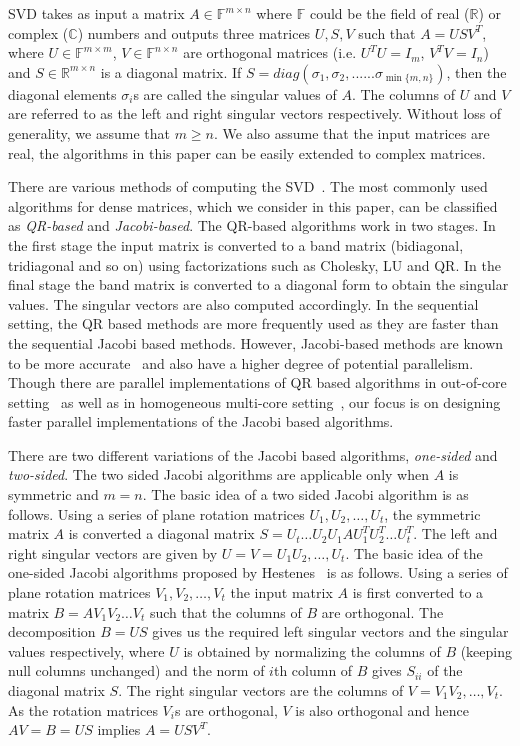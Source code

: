 \documentclass[10pt, conference, compsocconf]{IEEEtran}
\begin{document}
SVD takes as input a matrix $A \in \mathbb{F}^{m \times n}$ where $\mathbb{F}$ could be the field of real ($\mathbb{R}$) or complex ($\mathbb{C}$) numbers and outputs three matrices $U, S, V$ such that $A = USV^T$, where $U \in \mathbb{F}^{m \times m}$, $V \in \mathbb{F}^{n \times n}$ are orthogonal matrices (i.e. $U^TU = I_m$, $V^TV = I_n$) and $S \in \mathbb{R}^{m \times n}$ is a diagonal matrix. If $S = diag(\sigma_1, \sigma_2,......\sigma_{\min\{m,n\}})$, then the diagonal elements $\sigma_i$s are called the singular values of $A$. The columns of $U$ and $V$ are referred to as the left and right singular vectors respectively. Without loss of generality, we assume that $m \ge n$. We also assume that the input matrices are real, the algorithms in this paper can be easily extended to complex matrices. 

There are various methods of computing the SVD~\cite{golub2012matrix}. The most commonly used algorithms for dense matrices, which we consider in this paper, can be classified as \emph{QR-based} and \emph{Jacobi-based}. The QR-based algorithms work in two stages. In the first stage the input matrix is converted to a band matrix (bidiagonal, tridiagonal and so on) using factorizations such as Cholesky, LU and QR. In the final stage the band matrix is converted to a diagonal form to obtain the singular values. The singular vectors are also computed accordingly. In the sequential setting, the QR based methods are more frequently used as they are faster than the sequential Jacobi based methods. However, Jacobi-based methods are known to be more accurate~\cite{demmel1992jacobi} and also have a higher degree of potential parallelism. Though there are parallel implementations of QR based algorithms in out-of-core setting~\cite{grimes1987solution, grimes1988solution} as well as in homogeneous multi-core setting~\cite{haidar2013improved}, our focus is on designing faster parallel implementations of the Jacobi based algorithms.

There are two different variations of the Jacobi based algorithms, \emph{one-sided} and \emph{two-sided}. The two sided Jacobi algorithms are applicable only when $A$ is symmetric and $m=n$. The basic idea of a two sided Jacobi algorithm is as follows. Using a series of plane rotation matrices $U_1, U_2, \ldots, U_t$, the symmetric matrix $A$ is converted a diagonal matrix $S = U_t \ldots U_2 U_1 A U^T_1 U^T_2 \ldots U^T_t$. The left and right singular vectors are given by $U=V=U_1U_2,\ldots,U_t$. The basic idea of the one-sided Jacobi algorithms proposed by Hestenes~\cite{hestenes1958inversion} is as follows. Using a series of plane rotation matrices $V_1, V_2, \ldots, V_t$ the input matrix $A$ is first converted to a matrix $B=AV_1V_2\ldots V_t$ such that the columns of $B$ are orthogonal. The decomposition $B = US$ gives us the required left singular vectors and the singular values respectively, where $U$ is obtained by normalizing the columns of $B$ (keeping null columns unchanged) and the norm of $i$th column of $B$ gives $S_{ii}$ of the diagonal matrix $S$. The right singular vectors are the columns of $V=V_1V_2,\ldots,V_t$. As the rotation matrices $V_i$s are orthogonal, $V$ is also orthogonal and hence $AV = B = US$ implies $A = USV^T$.
\end{document}
